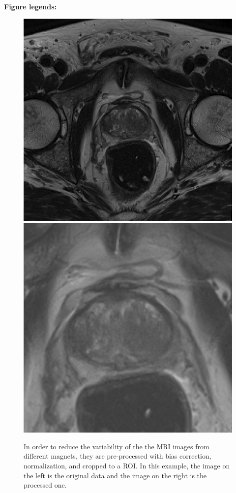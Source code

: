\textbf{Figure legends:}
\begin{figure}[h]
    \centering
    \includegraphics[totalheight=.15\textheight]{imgs/Preproc/Before.png}
    \hspace{10px}
    \includegraphics[totalheight=.15\textheight]{imgs/Preproc/After.png}
    \caption{In order to reduce the variability of the the MRI images from different magnets, they are pre-processed with bias correction, normalization, and cropped to a ROI.  In this example, the image on the left is the original data and the image on the right is the processed one. } \label{fig:roi}
\end{figure}

